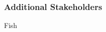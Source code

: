 \documentclass{sigchi}
\begin{document}
\subsubsection{Additional Stakeholders}
Fish

%
%
%
%
%
\balance



\end{document}

